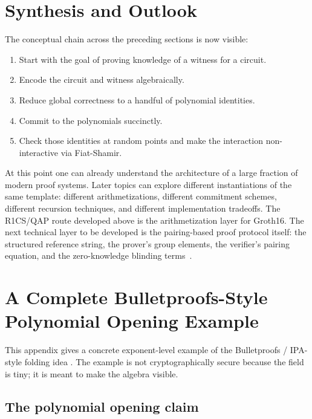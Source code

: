 \documentclass[11pt]{article}
\begin{document}
\section{Synthesis and Outlook}

The conceptual chain across the preceding sections is now visible:
\begin{enumerate}[leftmargin=2em]
    \item Start with the goal of proving knowledge of a witness for a circuit.
    \item Encode the circuit and witness algebraically.
    \item Reduce global correctness to a handful of polynomial identities.
    \item Commit to the polynomials succinctly.
    \item Check those identities at random points and make the interaction non-interactive via Fiat-Shamir.
\end{enumerate}

At this point one can already understand the architecture of a large fraction of modern proof systems. Later topics can explore different instantiations of the same template: different arithmetizations, different commitment schemes, different recursion techniques, and different implementation tradeoffs. The R1CS/QAP route developed above is the arithmetization layer for Groth16. The next technical layer to be developed is the pairing-based proof protocol itself: the structured reference string, the prover's group elements, the verifier's pairing equation, and the zero-knowledge blinding terms~\cite{Groth2016}.

\clearpage


\clearpage

\appendix

\section{A Complete Bulletproofs-Style Polynomial Opening Example}

This appendix gives a concrete exponent-level example of the Bulletproofs / IPA-style folding idea \cite{Bulletproofs2018}. The example is not cryptographically secure because the field is tiny; it is meant to make the algebra visible.

\subsection{The polynomial opening claim}
\end{document}
